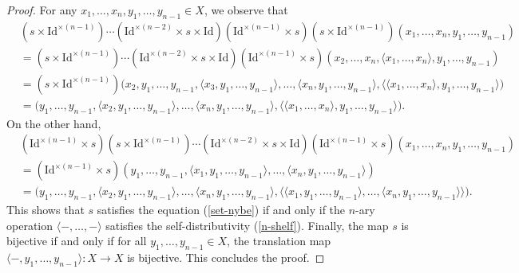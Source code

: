 \documentclass[a4paper,reqno,10pt]{amsart}
\theoremstyle{plain}
\theoremstyle{definition}
\theoremstyle{remark}
\begin{document}
\begin{proof}
    For any $x_1, \ldots, x_n, y_1, \ldots, y_{n-1} \in X$, we observe that 
     \begin{align*}
        & (s \times \mathrm{Id}^{\times (n-1)} ) \cdots (\mathrm{Id}^{\times (n-2)} \times s \times \mathrm{Id})(\mathrm{Id}^{\times (n-1)} \times s) (s \times \mathrm{Id}^{\times (n-1)}) (x_1, \ldots, x_n, y_1, \ldots, y_{n-1})\\
        &= (s \times \mathrm{Id}^{\times (n-1)} ) \cdots (\mathrm{Id}^{\times (n-2)} \times s \times \mathrm{Id})(\mathrm{Id}^{\times (n-1)} \times s) (x_2, \ldots, x_n, \langle x_1, \ldots, x_n \rangle, y_1, \ldots, y_{n-1} ) \\
        &= (s \times \mathrm{Id}^{\times (n-1)} ) \big(  x_2, y_1, \ldots, y_{n-1} , \langle x_3, y_1, \ldots, y_{n-1} \rangle, \ldots, \langle x_n, y_1, \ldots, y_{n-1} \rangle,  \langle \langle x_1, \ldots, x_n \rangle, y_1, \ldots, y_{n-1} \rangle  \big)\\
        &= \big( y_1, \ldots, y_{n-1}, \langle x_2, y_1, \ldots, y_{n-1} \rangle ,  \ldots, \langle x_n, y_1, \ldots, y_{n-1} \rangle, \langle \langle x_1, \ldots, x_n \rangle, y_1, \ldots, y_{n-1} \rangle    \big).
    \end{align*}
    On the other hand,
    \begin{align*}
       & (\mathrm{Id}^{\times (n-1)} \times s) (s \times \mathrm{Id}^{\times (n-1)}) \cdots (\mathrm{Id}^{\times (n-2)} \times s \times \mathrm{Id}) ( \mathrm{Id}^{\times (n-1)} \times s ) (x_1, \ldots, x_n, y_1, \ldots, y_{n-1}) \\
        &= (\mathrm{Id}^{\times (n-1)} \times s) (y_1, \ldots, y_{n-1}, \langle x_1, y_1, \ldots, y_{n-1} \rangle, \ldots, \langle x_n, y_1, \ldots, y_{n-1} \rangle ) \\
        &= \big( y_1, \ldots, y_{n-1}, \langle x_2, y_1, \ldots, y_{n-1} \rangle, \ldots, \langle x_n, y_1, \ldots, y_{n-1} \rangle, \langle \langle x_1, y_1, \ldots, y_{n-1}\rangle, \ldots,  \langle x_n, y_1, \ldots, y_{n-1}\rangle \rangle \big).
    \end{align*}
    This shows that $s$ satisfies the equation (\ref{set-nybe}) if and only if the $n$-ary operation $\langle -, \ldots, - \rangle$ satisfies the self-distributivity (\ref{n-shelf}). Finally, the map $s$ is bijective if and only if for all $y_1, \ldots, y_{n-1} \in X$, the translation map $\langle - , y_1, \ldots, y_{n-1} \rangle : X \rightarrow X$ is bijective. This concludes the proof.
\end{proof}
\end{document}
